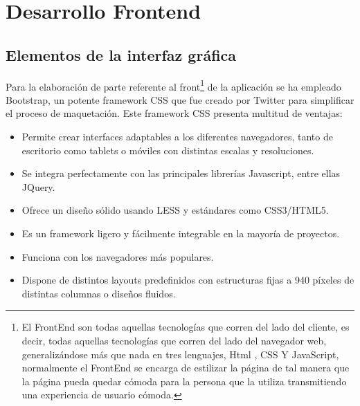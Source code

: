 

\chapter{ Desarrollo Frontend }
\label{chap:interfaz-gráfica}

\section {Elementos de la interfaz gráfica}

Para la elaboración de parte referente al front\footnote{ El FrontEnd son todas aquellas tecnologías que corren del lado del cliente, es decir, todas aquellas tecnologías que corren del lado del 
navegador web, generalizándose más que nada en tres lenguajes, Html , CSS Y JavaScript, normalmente el FrontEnd se encarga de estilizar la página de tal manera que la página pueda quedar cómoda 
para la persona que la utiliza transmitiendo una experiencia de usuario cómoda.} de la aplicación se ha empleado Bootstrap, un potente framework CSS que fue creado por Twitter para simplificar el
proceso de maquetación. Este framework CSS presenta multitud de ventajas:

\begin{itemize}
  \item Permite crear interfaces adaptables a los diferentes navegadores, tanto de escritorio como tablets o móviles con distintas escalas y resoluciones.

  \item Se integra perfectamente con las principales librerías Javascript, entre ellas JQuery.

  \item Ofrece un diseño sólido usando LESS y estándares como CSS3/HTML5.

  \item Es un framework ligero y fácilmente integrable en la mayoría de proyectos.

  \item Funciona con los navegadores más populares.

  \item Dispone de distintos layouts predefinidos con estructuras fijas a 940 píxeles de distintas columnas o diseños fluidos.
\end{itemize}

